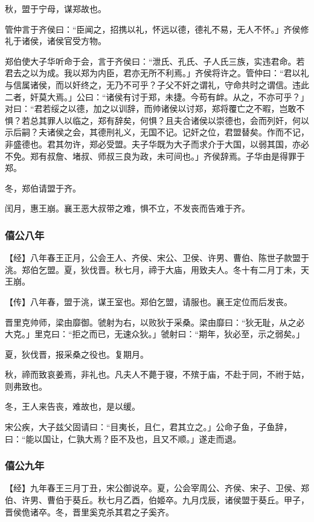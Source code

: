 \documentclass[]{article}
\begin{document}
秋，盟于宁母，谋郑故也。

管仲言于齐侯曰：``臣闻之，招携以礼，怀远以德，德礼不易，无人不怀。」齐侯修礼于诸侯，诸侯官受方物。

郑伯使大子华听命于会，言于齐侯曰：``泄氏、孔氏、子人氏三族，实违君命。若君去之以为成。我以郑为内臣，君亦无所不利焉。」齐侯将许之。管仲曰：``君以礼与信属诸侯，而以奸终之，无乃不可乎？子父不奸之谓礼，守命共时之谓信。违此二者，奸莫大焉。」公曰：``诸侯有讨于郑，未捷。今苟有衅。从之，不亦可乎？」对曰：``君若绥之以德，加之以训辞，而帅诸侯以讨郑，郑将覆亡之不暇，岂敢不惧？若总其罪人以临之，郑有辞矣，何惧？且夫合诸侯以崇德也，会而列奸，何以示后嗣？夫诸侯之会，其德刑礼义，无国不记。记奸之位，君盟替矣。作而不记，非盛德也。君其勿许，郑必受盟。夫子华既为大子而求介于大国，以弱其国，亦必不免。郑有叔詹、堵叔、师叔三良为政，未可间也。」齐侯辞焉。子华由是得罪于郑。

冬，郑伯请盟于齐。

闰月，惠王崩。襄王恶大叔带之难，惧不立，不发丧而告难于齐。

\hypertarget{header-n729}{%
\subsubsection{僖公八年}\label{header-n729}}

【经】八年春王正月，公会王人、齐侯、宋公、卫侯、许男、曹伯、陈世子款盟于洮。郑伯乞盟。夏，狄伐晋。秋七月，禘于大庙，用致夫人。冬十有二月丁未，天王崩。

【传】八年春，盟于洮，谋王室也。郑伯乞盟，请服也。襄王定位而后发丧。

晋里克帅师，梁由靡御。虢射为右，以败狄于采桑。梁由靡曰：``狄无耻，从之必大克。」里克曰：``拒之而已，无速众狄。」虢射曰：``期年，狄必至，示之弱矣。」

夏，狄伐晋，报采桑之役也。复期月。

秋，禘而致哀姜焉，非礼也。凡夫人不薨于寝，不殡于庙，不赴于同，不祔于姑，则弗致也。

冬，王人来告丧，难故也，是以缓。

宋公疾，大子兹父固请曰：``目夷长，且仁，君其立之。」公命子鱼，子鱼辞，曰：``能以国让，仁孰大焉？臣不及也，且又不顺。」遂走而退。

\hypertarget{header-n739}{%
\subsubsection{僖公九年}\label{header-n739}}

【经】九年春王三月丁丑，宋公御说卒。夏，公会宰周公、齐侯、宋子、卫侯、郑伯、许男、曹伯于葵丘。秋七月乙酉，伯姬卒。九月戊辰，诸侯盟于葵丘。甲子，晋侯佹诸卒。冬，晋里奚克杀其君之子奚齐。
\end{document}
